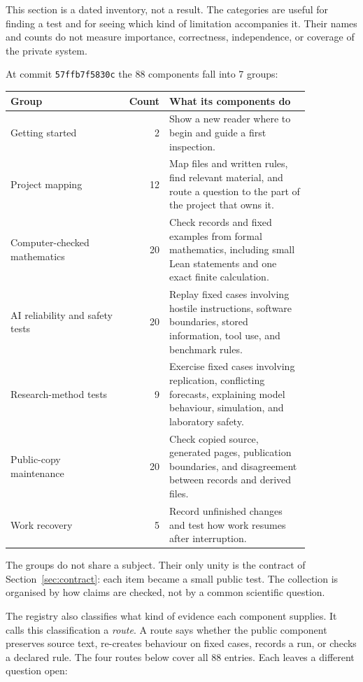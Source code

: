 \documentclass[11pt]{article}
\newcommand{\code}[1]{\texttt{#1}}
\newcommand{\snapshotshort}{57ffb7f5830c}
\newcommand{\componentcount}{88}
\newcommand{\familycount}{7}
\newcommand{\entrycount}{2}
\newcommand{\mappingcount}{12}
\newcommand{\mathcount}{20}
\newcommand{\safetycount}{20}
\newcommand{\researchcount}{9}
\newcommand{\publiccopycount}{20}
\newcommand{\recoverycount}{5}
\begin{document}
This section is a dated inventory, not a result. The categories are useful for
finding a test and for seeing which kind of limitation accompanies it. Their
names and counts do not measure importance, correctness, independence, or
coverage of the private system.

At commit \code{\snapshotshort} the \componentcount{} components fall into
\familycount{} groups:

\begin{center}
\small
\begin{tabular}{>{\raggedright\arraybackslash}p{0.38\linewidth}r>{\raggedright\arraybackslash}p{0.47\linewidth}}
\toprule
\textbf{Group} & \textbf{Count} & \textbf{What its components do} \\
\midrule
Getting started & \entrycount & Show a new reader where to begin and guide a first inspection. \\
Project mapping & \mappingcount & Map files and written rules, find relevant material, and route a question to the part of the project that owns it. \\
Computer-checked mathematics & \mathcount & Check records and fixed examples from formal mathematics, including small Lean statements and one exact finite calculation. \\
AI reliability and safety tests & \safetycount & Replay fixed cases involving hostile instructions, software boundaries, stored information, tool use, and benchmark rules. \\
Research-method tests & \researchcount & Exercise fixed cases involving replication, conflicting forecasts, explaining model behaviour, simulation, and laboratory safety. \\
Public-copy maintenance & \publiccopycount & Check copied source, generated pages, publication boundaries, and disagreement between records and derived files. \\
Work recovery & \recoverycount & Record unfinished changes and test how work resumes after interruption. \\
\bottomrule
\end{tabular}
\end{center}

The groups do not share a subject. Their only unity is the contract of
Section~\ref{sec:contract}: each item became a small public test. The collection
is organised by how claims are checked, not by a common scientific question.

The registry also classifies what kind of evidence each component supplies.
It calls this classification a \emph{route}. A route says whether the
public component preserves source text, re-creates behaviour on fixed cases,
records a run, or checks a declared rule. The four routes below cover all
\componentcount{} entries. Each leaves a different question open:
\end{document}
